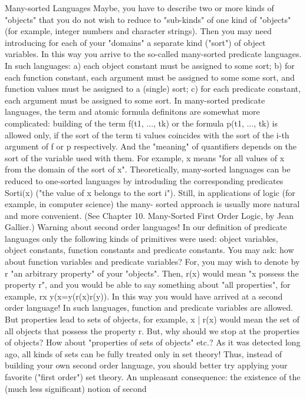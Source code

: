 Many-sorted Languages
Maybe, you have to describe two or more kinds of "objects" that you do not wish to reduce to "sub-kinds" of one kind of
"objects" (for example, integer numbers and character strings). Then you may need introducing for each of your "domains" a
separate kind ("sort") of object variables. In this way you arrive to the so-called many-sorted predicate languages. In such
languages: a) each object constant must be assigned to some sort; b) for each function constant, each argument must be
assigned to some some sort, and function values must be assigned to a (single) sort; c) for each predicate constant, each
argument must be assigned to some sort. In many-sorted predicate languages, the term and atomic formula definitons are
somewhat more complicated: building of the term f(t1, ..., tk) or the formula p(t1, ..., tk) is allowed only, if the sort of the term ti
values coincides with the sort of the i-th argument of f or p respectively. And the "meaning" of quantifiers depends on the sort
of the variable used with them. For example, \forall x means "for all values of x from the domain of the sort of x".
Theoretically, many-sorted languages can be reduced to one-sorted languages by introduding the corresponding predicates
Sorti(x) ("the value of x belongs to the sort i"). Still, in applications of logic (for example, in computer science) the many-
sorted approach is usually more natural and more convenient. (See Chapter 10. Many-Sorted First Order Logic, by Jean
Gallier.)
Warning about second order languages!
In our definition of predicate languages only the following kinds of primitives were used: object variables, object constants,
function constants and predicate constants. You may ask: how about function variables and predicate variables? For, you
may wish to denote by r "an arbitrary property" of your "objects". Then, r(x) would mean "x possess the property r", and you
would be able to say something about "all properties", for example, \forall r\forall x \forall y(x=y\IMPLIES (r(x)\IFF r(y)). In this way you would have
arrived at a second order language! In such languages, function and predicate variables are allowed. But properties lead to
sets of objects, for example, {x | r(x)} would mean the set of all objects that possess the property r. But, why should we stop at
the properties of objects? How about "properties of sets of objects" etc.? As it was detected long ago, all kinds of sets can be
fully treated only in set theory! Thus, instead of building your own second order language, you should better try applying your
favorite ("first order") set theory. An unpleasant consequence: the existence of the (much less significant) notion of second
